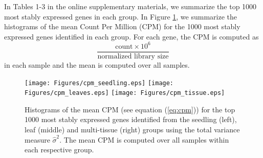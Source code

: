 	In Tables 1-3 in the online supplementary materials, we summarize the
	top 1000 most stably expressed genes in each group.  In Figure \ref{cpm}, we
	summarize the histograms of the mean Count Per Million (CPM) for the 1000
	most stably expressed genes identified in each group. For each gene, the CPM
	is computed as
	\begin{equation}\label{eq:cpm}
		\dfrac{ \text{count} \times 10^6 }{ \text{normalized library size}} 
	\end{equation}
	in each sample and the mean is computed over all samples.
	
	\begin{figure}[tbp] \begin{center}
			\texttt{[image: Figures/cpm\_seedling.eps]}
			\texttt{[image: Figures/cpm\_leaves.eps]}
			\texttt{[image: Figures/cpm\_tissue.eps]}
			\caption{{\small{\label{cpm} 
						Histograms of the mean CPM (see equation (\ref{eq:cpm})) for the top 1000
						most stably expressed genes identified from the seedling (left), leaf (middle) and multi-tissue
						(right) groups
						using  the total variance measure $\hat{\sigma}^2$}}. 
				The mean CPM is computed over all samples within each respective group.
			} \end{center} 
		\end{figure} 
		
		
